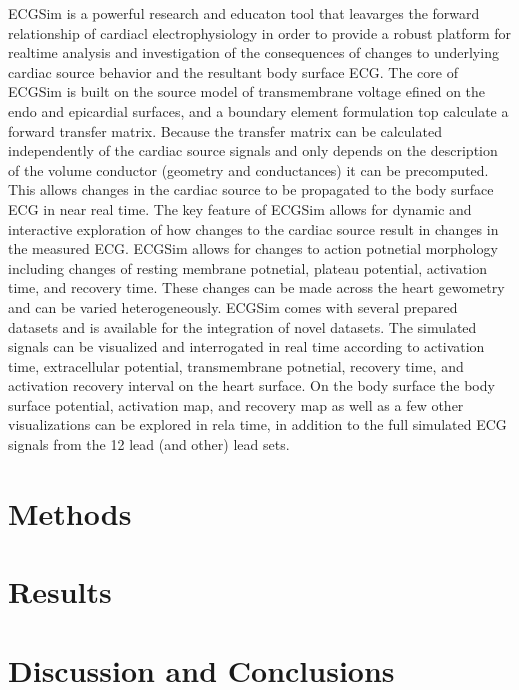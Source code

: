 \documentclass[12pt]{article}
\begin{document}
ECGSim is a powerful research and educaton tool that leavarges the forward relationship of cardiacl electrophysiology in order to provide a robust platform for realtime analysis and investigation of the consequences of changes to underlying cardiac source behavior and the resultant body surface ECG. The core of ECGSim is built on the source model of transmembrane voltage efined on the endo and epicardial surfaces, and a boundary element formulation top calculate a forward transfer matrix. Because the transfer matrix can be calculated independently of the cardiac source signals and only depends on the description of the volume conductor (geometry and conductances) it can be precomputed. This allows changes in the cardiac source to be propagated to the body surface ECG in near real time. The key feature of ECGSim allows for dynamic and interactive exploration of how changes to the cardiac source result in changes in the measured ECG. ECGSim allows for changes to action potnetial morphology including changes of resting membrane potnetial, plateau potential, activation time, and recovery time. These changes can be made across the heart gewometry and can be varied heterogeneously. ECGSim comes with several prepared datasets and is available for the integration of novel datasets. The simulated signals can be visualized and interrogated in real time according to activation time, extracellular potential, transmembrane potnetial, recovery time, and activation recovery interval on the heart surface. On the body surface the body surface potential, activation map, and recovery map as well as a few other visualizations can be explored in rela time, in addition to the full simulated ECG signals from the 12 lead (and other) lead sets.

\section{Methods}


\section{Results}

\section{Discussion and Conclusions}
\end{document}
